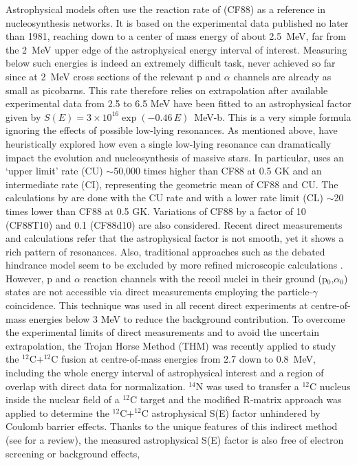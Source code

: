\documentclass{aastex631}
\begin{document}
Astrophysical models often use the reaction rate of \citet{cf88} (CF88) as a reference in nucleosynthesis networks. 
It is based on the experimental data published no later than 1981, reaching down to a center of mass energy of
about 2.5~MeV, far from the 2~MeV upper edge of the astrophysical energy interval of interest.
Measuring below such energies is indeed an extremely difficult task, never achieved so far since at 2~MeV cross sections of the relevant p and $\alpha$ channels
are already as small as picobarns. This rate therefore relies on extrapolation after available 
experimental data from 2.5 to 6.5 MeV have been fitted to an astrophysical factor given by $S(E) = 3\times 10^{16} \exp(-0.46\,E)$~MeV-b. This is a very simple formula ignoring the effects of possible low-lying resonances.
As mentioned above, \citet{be12,pi13} have heuristically explored how even a single low-lying resonance can dramatically impact the evolution and nucleosynthesis of massive stars. In particular, \citet{be12} uses an ‘upper limit’ rate (CU) $\sim$50,000 times higher than CF88 at 0.5 GK and an intermediate rate (CI), representing the geometric mean of CF88 and CU. The calculations by \citet{pi13} are done with the CU rate and with a lower rate limit (CL) $\sim$20 times lower than CF88 at 0.5 GK. Variations of CF88 by a factor of 10 (CF88T10) and 0.1 (CF88d10) are also considered. Recent direct measurements \citep{ji18,fr20,ta20} and calculations \citep{bn20} refer that the astrophysical factor is not smooth, yet it shows a rich pattern of resonances. Also, traditional approaches such as the debated hindrance model seem to be excluded by more refined microscopic calculations \citep{go19}. However, p and $\alpha$ reaction channels with the recoil nuclei in their ground (p$_0$,$\alpha_0$) states are not accessible via direct measurements employing the particle-$\gamma$ coincidence. This technique was used in all recent direct experiments at centre-of-mass energies below 3 MeV to reduce the background contribution.
To overcome the experimental limits of direct measurements and to avoid the uncertain extrapolation, the Trojan Horse Method (THM) was recently applied to study the $^{12}$C$+^{12}$C fusion \citep{thm18} at centre-of-mass energies from 2.7 down to 0.8~MeV, including the whole energy interval of astrophysical interest and a region of overlap with direct data for normalization. 
$^{14}$N was used to transfer a $^{12}$C nucleus inside the nuclear field of a $^{12}$C target and the modified R-matrix approach was applied to determine the $^{12}$C$+^{12}$C astrophysical S(E) factor unhindered by Coulomb barrier effects. Thanks to the unique features of this indirect method  (see \citet{spit2019,tumino21} for a review), the measured astrophysical S(E) factor is also free of electron screening or background effects,
\end{document}
